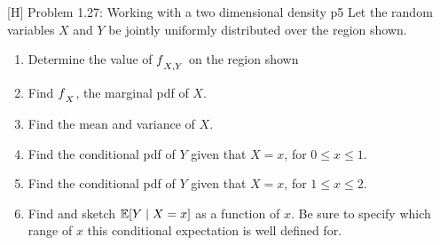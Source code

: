 \documentclass[a4paper, 11pt]{article}
\begin{document}
\begin{problem}{%
		[H] Problem 1.27: Working with a two dimensional density
	}{p5%
	}
 Let the random variables $X$ and $Y$ be jointly uniformly distributed over the region shown.
 \begin{center}
 \end{center}
\begin{enumerate}[label=(\alph*)]
	\item Determine the value of $f\strut_{X,Y}$ on the region shown
	\item Find $f\strut_X$, the marginal pdf of $X$.
	\item Find the mean and variance of $X$.
	\item Find the conditional pdf of $Y$ given that $X=x$, for $0\leq x\leq 1$.
	\item Find the conditional pdf of $Y$ given that $X=x$, for $1\leq x\leq 2$.
	\item Find and sketch $\mathbb{E}[Y\mid X=x]$ as a function of $x$. Be sure to specify which range of $x$ this conditional expectation is well defined for.
\end{enumerate}
\end{problem}
\end{document}

